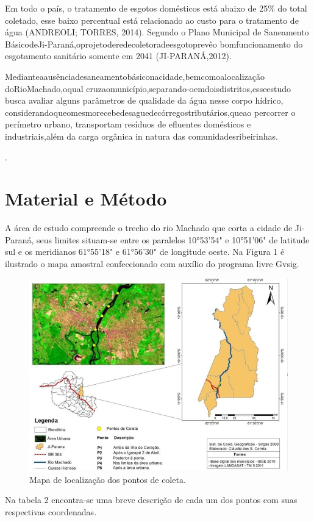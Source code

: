 \documentclass[article,12pt,onesidea,4paper,english,brazil]{abntex2}
\begin{document}
Em todo o país, o tratamento de esgotos domésticos está abaixo de 25\% do total coletado, esse baixo percentual está relacionado ao custo para o tratamento de água (ANDREOLI; TORRES, 2014). Segundo o Plano Municipal de Saneamento BásicodeJi-Paraná,oprojetoderedecoletoradeesgotoprevêo
bomfuncionamento do esgotamento sanitário somente em 2041 (JI-PARANÁ,2012).

Medianteaausênciadesaneamentobásiconacidade,bemcomoalocalização doRioMachado,oqual
cruzaomunicípio,separando-oemdoisdistritos,esseestudo busca avaliar alguns parâmetros de qualidade da água nesse corpo hídrico, considerandoqueomesmorecebedesaguedecórregostributários,queao
percorrer o perímetro urbano, transportam resíduos de efluentes domésticos e industriais,além da carga orgânica in natura das comunidadesribeirinhas.

	.
	
	\section*{Material e Método}
	
	A área de estudo compreende o trecho do rio Machado que corta a cidade de Ji-Paraná, seus limites situam-se entre os paralelos 10°53'54" e 10°51'06" de latitude sul e os meridianos 61°55'18" e 61°56'30" de longitude oeste. Na Figura 1 é ilustrado o mapa amostral confeccionado com auxílio do programa livre Gvsig.
	\begin{figure}[h]
		\centering
		\includegraphics[width=0.7\linewidth]{pip-137-01}
		\caption{Mapa de localização dos pontos de coleta.}
	\end{figure}

Na tabela 2 encontra-se uma breve descrição de cada um dos pontos com suas respectivas coordenadas.
\end{document}
